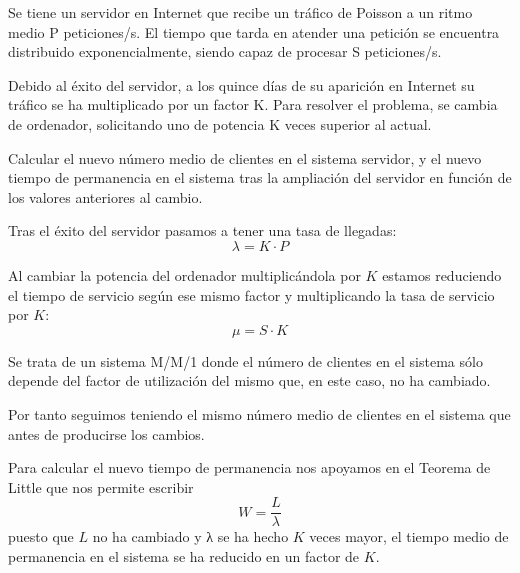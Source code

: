 \begin{problem}[2]
Se tiene un servidor en Internet que recibe un tráfico de Poisson a un ritmo medio P peticiones/s. El tiempo que tarda en atender una petición se encuentra distribuido exponencialmente, siendo capaz de procesar S peticiones/s.

Debido al éxito del servidor, a los quince días de su aparición en Internet su tráfico se ha multiplicado por un factor K. Para resolver el problema, se cambia de ordenador, solicitando uno de potencia K veces superior al actual.

Calcular el nuevo número medio de clientes en el sistema servidor, y el nuevo tiempo de permanencia en el sistema tras la ampliación del servidor en función de los valores anteriores al cambio.

\solution

Tras el éxito del servidor pasamos a tener una tasa de llegadas:
\[λ = K \cdot P\]

Al cambiar la potencia del ordenador multiplicándola por $K$ estamos reduciendo el tiempo de servicio según ese mismo factor y multiplicando la tasa de servicio por $K$:
\[μ = S \cdot K\]

Se trata de un sistema M/M/1 donde el número de clientes en el sistema sólo depende del factor de utilización del mismo que, en este caso, no ha cambiado.

Por tanto seguimos teniendo el mismo número medio de clientes en el sistema que antes de producirse los cambios.

Para calcular el nuevo tiempo de permanencia nos apoyamos en el Teorema de Little que nos permite escribir
\[W = \frac{L}{λ}\]
puesto que $L$ no ha cambiado y λ se ha hecho $K$ veces mayor, el tiempo medio de permanencia en el sistema se ha reducido en un factor de $K$.

\end{problem}


